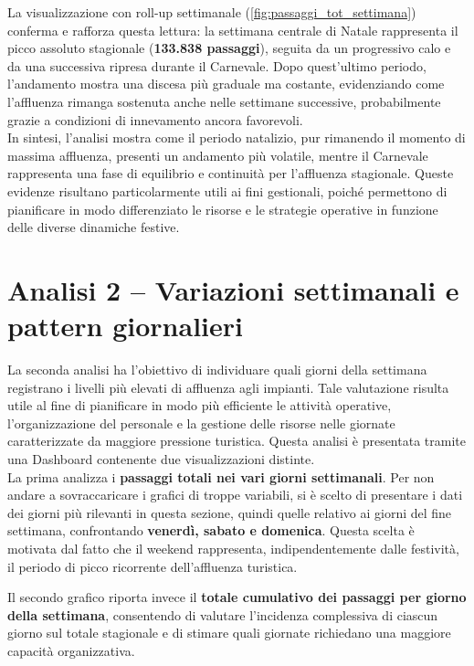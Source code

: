 La visualizzazione con roll-up settimanale (\ref{fig:passaggi_tot_settimana}) conferma e rafforza questa lettura: la settimana centrale di Natale rappresenta il picco assoluto stagionale (\textbf{133.838 passaggi}), seguita da un progressivo calo e da una successiva ripresa durante il Carnevale.  
Dopo quest’ultimo periodo, l’andamento mostra una discesa più graduale ma costante, evidenziando come l’affluenza rimanga sostenuta anche nelle settimane successive, probabilmente grazie a condizioni di innevamento ancora favorevoli.\\

In sintesi, l’analisi mostra come il periodo natalizio, pur rimanendo il momento di massima affluenza, presenti un andamento più volatile, mentre il Carnevale rappresenta una fase di equilibrio e continuità per l’affluenza stagionale.  
Queste evidenze risultano particolarmente utili ai fini gestionali, poiché permettono di pianificare in modo differenziato le risorse e le strategie operative in funzione delle diverse dinamiche festive.

\section{Analisi 2 – Variazioni settimanali e pattern giornalieri}
\label{sec:analisi2}

La seconda analisi ha l'obiettivo di individuare quali giorni della settimana registrano i livelli più elevati di affluenza agli impianti. Tale valutazione risulta utile al fine di pianificare in modo più efficiente le attività operative, l'organizzazione del personale e la gestione delle risorse nelle giornate caratterizzate da maggiore pressione turistica. Questa analisi è presentata tramite una Dashboard contenente due visualizzazioni distinte.\\

 La prima analizza i \textbf{passaggi totali nei vari giorni settimanali}. Per non andare a sovraccaricare i grafici di troppe variabili, si è scelto di presentare i dati dei giorni più rilevanti in questa sezione, quindi quelle relativo ai giorni del fine settimana, confrontando \textbf{venerdì, sabato e domenica}. Questa scelta è motivata dal fatto che il weekend rappresenta, indipendentemente dalle festività, il periodo di picco ricorrente dell’affluenza turistica.

Il secondo grafico riporta invece il \textbf{totale cumulativo dei passaggi per giorno della settimana}, consentendo di valutare l’incidenza complessiva di ciascun giorno sul totale stagionale e di stimare quali giornate richiedano una maggiore capacità organizzativa.

